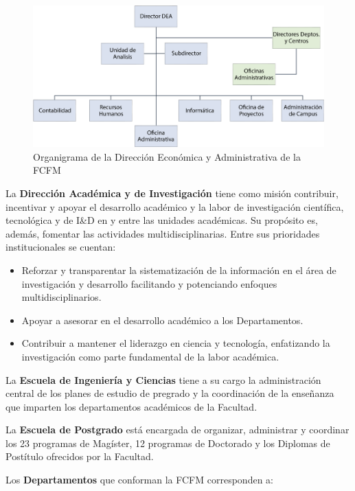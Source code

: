 \begin{figure}[ht!]
\centering
\includegraphics[width=\columnwidth]{./organigramas/organigrama_dea_fcfm.eps}
\caption{Organigrama de la Dirección Económica y Administrativa de la FCFM}
\label{ograma_dea_fcfm}
\end{figure}

La \textbf{Dirección Académica y de Investigación} tiene como misión contribuir, incentivar y
apoyar el desarrollo académico y la labor de investigación científica, tecnológica y de I\&D
en y entre las unidades académicas. Su propósito es, además, fomentar las actividades
multidisciplinarias. Entre sus prioridades institucionales se cuentan:

\begin{itemize}
\item Reforzar y transparentar la sistematización de la información en el área de investigación y
desarrollo facilitando y potenciando enfoques multidisciplinarios.
\item Apoyar a asesorar en el desarrollo académico a los Departamentos.
\item Contribuir a mantener el liderazgo en ciencia y tecnología, enfatizando la investigación como
parte fundamental de la labor académica.
\end{itemize}

La \textbf{Escuela de Ingeniería y Ciencias} tiene a su cargo la administración central de los planes de
estudio de pregrado y la coordinación de la enseñanza que imparten los departamentos académicos
de la Facultad.

La \textbf{Escuela de Postgrado} está encargada de organizar, administrar y coordinar los 23
programas de Magíster, 12 programas de Doctorado y los Diplomas de Postítulo ofrecidos por
la Facultad.

Los \textbf{Departamentos} que conforman la FCFM corresponden a:

